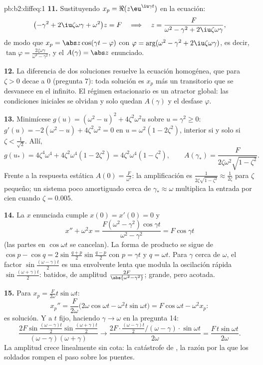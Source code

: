 \begin{solution}{pb:b2:diffeq:1}
\textbf{11.} Sustituyendo $x_p = \Re(z\eu^{\iu\gamma t})$ en la
ecuación:
\[
\bigl(-\gamma^2 + 2\iu\zeta\omega\gamma +
\omega^2\bigr)z = F
\quad\Longrightarrow\quad
z = \frac{F}{\omega^2 - \gamma^2 + 2\iu\zeta\omega\gamma},
\]
de modo que $x_p = \abs z\cos(\gamma t - \varphi)$ con $\varphi =
\arg(\omega^2 - \gamma^2 + 2\iu\zeta\omega\gamma)$, es decir,
$\tan\varphi = \frac{2\zeta\omega\gamma}{\omega^2 - \gamma^2}$, y el
$A(\gamma) = \abs z$ enunciado.

\textbf{12.} La diferencia de dos soluciones resuelve la ecuación
homogénea, que para $\zeta > 0$ decae a $0$ (pregunta 7): toda
solución es $x_p$ más un transitorio que se desvanece en el infinito.
El régimen estacionario es un atractor global: las condiciones
iniciales se olvidan y solo quedan $A(\gamma)$ y el desfase
$\varphi$.

\textbf{13.} Minimícese $g(u) = (\omega^2 - u)^2 +
4\zeta^2\omega^2u$ sobre $u = \gamma^2 \geq 0$: $g'(u) = -2(\omega^2
- u) + 4\zeta^2\omega^2 = 0$ en $u = \omega^2(1 - 2\zeta^2)$,
interior si y solo si $\zeta < \frac{1}{\sqrt2}$. Allí,
\[
g(u_*) = 4\zeta^4\omega^4 + 4\zeta^2\omega^4(1 - 2\zeta^2)
= 4\zeta^2\omega^4(1 - \zeta^2),
\qquad
A(\gamma_*) = \frac{F}{2\zeta\omega^2\sqrt{1 - \zeta^2}} .
\]
Frente a la respuesta estática $A(0) = \frac{F}{\omega^2}$: la
amplificación es $\frac{1}{2\zeta\sqrt{1-\zeta^2}} \approx
\frac{1}{2\zeta}$ para $\zeta$ pequeño; un sistema poco amortiguado
cerca de $\gamma_* \approx \omega$ multiplica la entrada por cien
cuando $\zeta = 0.005$.

\textbf{14.} La $x$ enunciada cumple $x(0) = x'(0) = 0$ y
\[
x'' + \omega^2 x = \frac{F(\omega^2 -
\gamma^2)\cos\gamma t}{\omega^2 - \gamma^2} = F\cos\gamma t
\]
(las partes en $\cos\omega t$ se cancelan). La forma de producto se
sigue de $\cos p - \cos q = 2\sin\frac{q+p}{2}\sin\frac{q-p}2$ con $p
= \gamma t$ y $q = \omega t$. Para $\gamma$ cerca de $\omega$, el
factor $\sin\frac{(\omega-\gamma)t}2$ es una envolvente lenta que
modula la oscilación rápida $\sin\frac{(\omega+\gamma)t}2$: batidos,
de amplitud $\frac{2F}{\abs{\omega^2-\gamma^2}}$; grande, pero
acotada.

\textbf{15.} Para $x_p = \frac{F}{2\omega}t\sin\omega t$:
\[
x_p'' = \frac{F}{2\omega}\bigl(2\omega\cos\omega t -
\omega^2t\sin\omega t\bigr)
= F\cos\omega t - \omega^2x_p :
\]
es solución. Y a $t$ fijo, haciendo $\gamma \to \omega$ en la
pregunta 14:
\[
\frac{2F\sin\frac{(\omega-\gamma)t}2
\sin\frac{(\omega+\gamma)t}{2}}
{(\omega-\gamma)(\omega+\gamma)}
\longrightarrow
\frac{2F\cdot\frac{(\omega-\gamma)t}2\big/(\omega-\gamma)
\cdot\sin\omega t}{2\omega}
= \frac{F\,t\sin\omega t}{2\omega} .
\]
La amplitud crece linealmente sin cota: la catástrofe de
, la razón por la que los soldados rompen el paso sobre los
puentes.


\end{solution}
